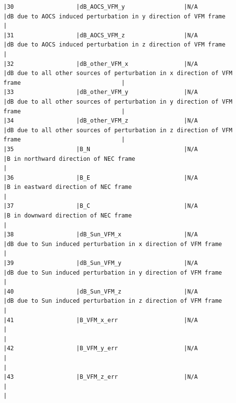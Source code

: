 \begin{verbatim}
|30                  |dB_AOCS_VFM_y                 |N/A                           |dB due to AOCS induced perturbation in y direction of VFM frame                                     |
|31                  |dB_AOCS_VFM_z                 |N/A                           |dB due to AOCS induced perturbation in z direction of VFM frame                                     |
|32                  |dB_other_VFM_x                |N/A                           |dB due to all other sources of perturbation in x direction of VFM frame                             |
|33                  |dB_other_VFM_y                |N/A                           |dB due to all other sources of perturbation in y direction of VFM frame                             |
|34                  |dB_other_VFM_z                |N/A                           |dB due to all other sources of perturbation in z direction of VFM frame                             |
|35                  |B_N                           |N/A                           |B in northward direction of NEC frame                                                               |
|36                  |B_E                           |N/A                           |B in eastward direction of NEC frame                                                                |
|37                  |B_C                           |N/A                           |B in downward direction of NEC frame                                                                |
|38                  |dB_Sun_VFM_x                  |N/A                           |dB due to Sun induced perturbation in x direction of VFM frame                                      |
|39                  |dB_Sun_VFM_y                  |N/A                           |dB due to Sun induced perturbation in y direction of VFM frame                                      |
|40                  |dB_Sun_VFM_z                  |N/A                           |dB due to Sun induced perturbation in z direction of VFM frame                                      |
|41                  |B_VFM_x_err                   |N/A                           |                                                                                                    |
|42                  |B_VFM_y_err                   |N/A                           |                                                                                                    |
|43                  |B_VFM_z_err                   |N/A                           |                                                                                                    |

\end{verbatim}
